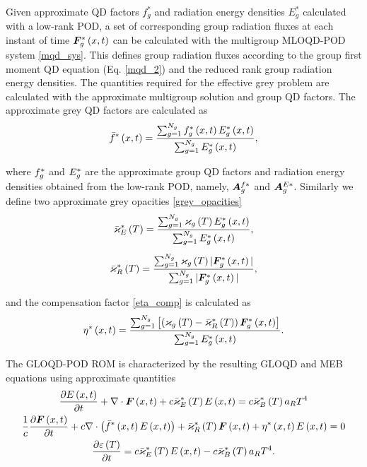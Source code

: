 	\ind Given approximate QD factors $f_g^*$ and radiation energy densities $E_g^*$ calculated with a low-rank POD, a set of corresponding group radiation fluxes at each instant of time $\bm{F}_g^*\left( x,t\right)$ can be calculated with the multigroup MLOQD-POD system \eqref{mqd_sys}. This defines group radiation fluxes according to the group first moment QD equation (Eq. \ref{mqd_2}) and the reduced rank group radiation energy densities. The quantities required for the effective grey problem are calculated with the approximate multigroup solution and group QD factors. The approximate grey QD factors are calculated as
	\begin{align}
		\bar{f}^*\left( x,t\right) = \frac{ \sum_{g=1}^{N_g}f_g^*\left( x,t\right)E_g^*\left( x,t\right) }{ \sum_{g=1}^{N_g}E_g^*\left( x,t\right) },
	\end{align}
	
	where $f_g^*$ and $E_g^*$ are the approximate group QD factors and radiation energy densities obtained from the low-rank POD, namely, $\bm{A}^{f*}_g$ and $\bm{A}^{E*}_g$. Similarly we define two approximate grey opacities \eqref{grey_opacities}
	\begin{gather}
		\bar{\varkappa}_{E}^*\left( T\right) = \frac{ \sum_{g=1}^{N_g}\varkappa_{g}\left( T\right)E_g^*\left( x,t\right) }{ \sum_{g=1}^{N_g}E_g^*\left( x,t\right) }, \\[5pt]
		\bar{\varkappa}_{R}^*\left( T\right) = \frac{ \sum_{g=1}^{N_g}\varkappa_{g}\left( T\right)|\bm{F}_g^*\left( x,t\right)| }{ \sum_{g=1}^{N_g}|\bm{F}_g^*\left( x,t\right)| },
	\end{gather}
	
	and the compensation factor \eqref{eta_comp} is calculated as
	\begin{equation}
		\eta^*\left( x,t\right) = \frac{ \sum_{g=1}^{N_g}\left[\left(\varkappa_{g}\left( T\right) - \bar{\varkappa}_{R}^*\left( T\right)\right)\bm{F}_g^*\left( x,t\right)\right] }{ \sum_{g=1}^{N_g}E_g^*\left( x,t\right) }.
	\end{equation}
	
	The GLOQD-POD ROM is characterized by the resulting GLOQD and MEB equations using approximate quantities
	\begin{subequations}
		\begin{gather}
			\frac{\partial E\left( x,t\right)}{\partial t} + \nabla\cdot\bm{F}\left( x,t\right) + c\bar{\varkappa}_{E}^*\left( T\right)E\left( x,t\right) = c\bar{\varkappa}_{B}^*\left( T\right)a_R T^4 \label{glqd_pod_zero} \\
			\frac{1}{c}\frac{\partial \bm{F}\left( x,t\right)}{\partial t} + c\nabla\cdot\left(\bar{f}^*\left( x,t\right)E\left( x,t\right)\right) + \bar{\varkappa}_{R}^*\left( T\right)\bm{F}\left( x,t\right) + \eta^*\left( x,t\right)E\left( x,t\right)= 0 \label{glqd_pod_first} \\
			\frac{\partial \varepsilon\left( T\right)}{\partial t} = c\bar{\varkappa}_{E}^*\left( T\right)E\left( x,t\right) - c\bar{\varkappa}_{B}^*\left( T\right)a_R T^4. \label{EB_gpod}
		\end{gather}
		\label{glqd_pod_eqs}
	\end{subequations}


